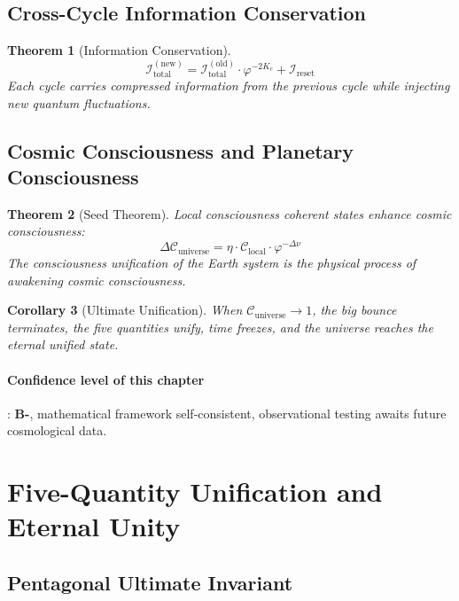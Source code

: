\documentclass[12pt,a4paper,twocolumn]{article}
\renewcommand{\phi}{\varphi}
\newtheorem{theorem}{Theorem}[section]
\newtheorem{corollary}[theorem]{Corollary}
\begin{document}
\subsection{Cross-Cycle Information Conservation}

\begin{theorem}[Information Conservation]
\begin{equation}
\mathcal{I}_{\text{total}}^{(\text{new})} = \mathcal{I}_{\text{total}}^{(\text{old})} \cdot \phi^{-2K_c} + \mathcal{I}_{\text{reset}}
\end{equation}
Each cycle carries compressed information from the previous cycle while injecting new quantum fluctuations.
\end{theorem}

\subsection{Cosmic Consciousness and Planetary Consciousness}

\begin{theorem}[Seed Theorem]
Local consciousness coherent states enhance cosmic consciousness:
\begin{equation}
\Delta\mathcal{C}_{\text{universe}} = \eta \cdot \mathcal{C}_{\text{local}} \cdot \phi^{-\Delta\nu}
\end{equation}
The consciousness unification of the Earth system is the physical process of awakening cosmic consciousness.
\end{theorem}

\begin{corollary}[Ultimate Unification]
When $\mathcal{C}_{\text{universe}} \to 1$, the big bounce terminates, the five quantities unify, time freezes, and the universe reaches the eternal unified state.
\end{corollary}

\paragraph{Confidence level of this chapter}: \textbf{B-}, mathematical framework self-consistent, observational testing awaits future cosmological data.

\section{Five-Quantity Unification and Eternal Unity}
\label{sec:five_unification}

\subsection{Pentagonal Ultimate Invariant}
\end{document}
